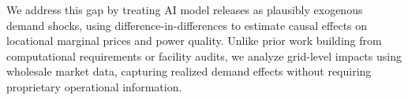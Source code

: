 \documentclass[a4paper,fleqn,longmktitle]{cas-sc}
\theoremstyle{plain}
\theoremstyle{definition}
\begin{document}
We address this gap by treating AI model releases as plausibly exogenous demand shocks, using difference-in-differences to estimate causal effects on locational marginal prices and power quality. Unlike prior work building from computational requirements or facility audits, we analyze grid-level impacts using wholesale market data, capturing realized demand effects without requiring proprietary operational information.





\end{document}
